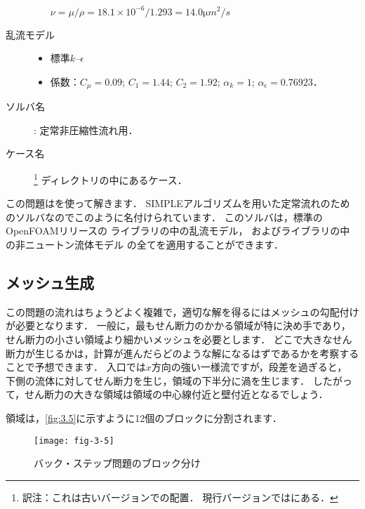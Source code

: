 \begin{description}
\begin{itemize}
                   $\nu = \mu/\rho = 18.1 \times 10^{-6}/1.293 = 14.0 \unit{\micro m^{2}/s}$
            \end{itemize}
 \item[乱流モデル] \mbox{}
            \begin{itemize}
             \item 標準$k$--$\epsilon$
             \item 係数：$C_{\mu} = 0.09$; $C_{1} = 1.44$; $C_{2} = 1.92$;
                   $\alpha_{k} = 1$; $\alpha_{\epsilon} = 0.76923$．
            \end{itemize}
 \item[ソルバ名] : 定常非圧縮性流れ用．
 \item[ケース名] %
\footnote{訳注：これは古いバージョンでの配置．
現行バージョンではにある．}%
            ディレクトリの中にあるケース．
\end{description}

この問題はを使って解きます．
SIMPLEアルゴリズムを用いた定常流れのためのソルバなのでこのように名付けられています．
このソルバは，標準のOpenFOAMリリースの
ライブラリの中の乱流モデル，
およびライブラリの中の非ニュートン流体モデル
の全てを適用することができます．


\subsection{メッシュ生成}
\label{ssec:3.2.2}
この問題の流れはちょうどよく複雑で，適切な解を得るにはメッシュの勾配付けが必要となります．
一般に，最もせん断力のかかる領域が特に決め手であり，せん断力の小さい領域より細かいメッシュを必要とします．
どこで大きなせん断力が生じるかは，計算が進んだらどのような解になるはずであるかを考察することで予想できます．
入口では$x$方向の強い一様流ですが，段差を過ぎると，
下側の流体に対してせん断力を生じ，領域の下半分に渦を生じます．
したがって，せん断力の大きな領域は領域の中心線付近と壁付近となるでしょう．

領域は，\autoref{fig:3.5}に示すように12個のブロックに分割されます．


\begin{figure}[ht]
 \texttt{[image: fig-3-5]}
 \caption{バック・ステップ問題のブロック分け}
 \label{fig:3.5}
\end{figure}


